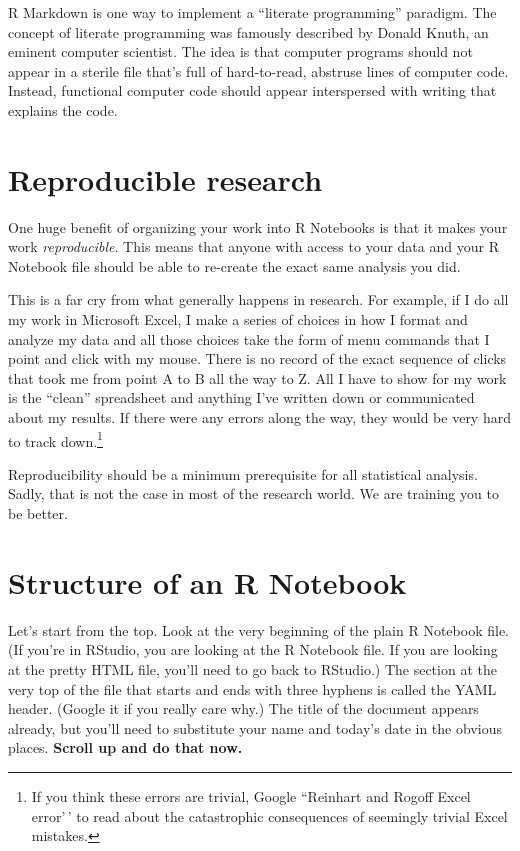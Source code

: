 \documentclass[
]{book}
\begin{document}
R Markdown is one way to implement a ``literate programming'' paradigm. The concept of literate programming was famously described by Donald Knuth, an eminent computer scientist. The idea is that computer programs should not appear in a sterile file that's full of hard-to-read, abstruse lines of computer code. Instead, functional computer code should appear interspersed with writing that explains the code.

\hypertarget{rmark-reproducible}{%
\section{Reproducible research}\label{rmark-reproducible}}

One huge benefit of organizing your work into R Notebooks is that it makes your work \emph{reproducible}. This means that anyone with access to your data and your R Notebook file should be able to re-create the exact same analysis you did.

This is a far cry from what generally happens in research. For example, if I do all my work in Microsoft Excel, I make a series of choices in how I format and analyze my data and all those choices take the form of menu commands that I point and click with my mouse. There is no record of the exact sequence of clicks that took me from point A to B all the way to Z. All I have to show for my work is the ``clean'' spreadsheet and anything I've written down or communicated about my results. If there were any errors along the way, they would be very hard to track down.\footnote{If you think these errors are trivial, Google ``Reinhart and Rogoff Excel error'\,' to read about the catastrophic consequences of seemingly trivial Excel mistakes.}

Reproducibility should be a minimum prerequisite for all statistical analysis. Sadly, that is not the case in most of the research world. We are training you to be better.

\hypertarget{rmark-structure}{%
\section{Structure of an R Notebook}\label{rmark-structure}}

Let's start from the top. Look at the very beginning of the plain R Notebook file. (If you're in RStudio, you are looking at the R Notebook file. If you are looking at the pretty HTML file, you'll need to go back to RStudio.) The section at the very top of the file that starts and ends with three hyphens is called the YAML header. (Google it if you really care why.) The title of the document appears already, but you'll need to substitute your name and today's date in the obvious places. \textbf{Scroll up and do that now.}
\end{document}
